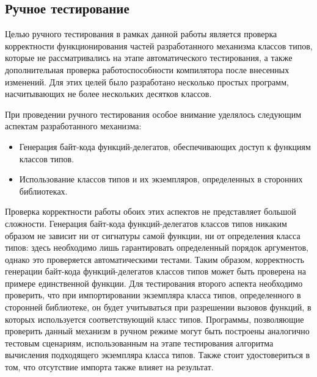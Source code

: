 \subsection{Ручное тестирование}

Целью ручного тестирования в рамках данной работы является проверка корректности функционирования частей разработанного механизма классов типов, которые не рассматривались на этапе автоматического тестирования, а также дополнительная проверка работоспособности компилятора после внесенных изменений. Для этих целей было разработано несколько простых программ, насчитывающих не более нескольких десятков классов. 

При проведении ручного тестирования особое внимание уделялось следующим аспектам разработанного механизма:
\begin{itemize}
    \item Генерация байт-кода функций-делегатов, обеспечивающих доступ к функциям классов типов.
    \item Использование классов типов и их экземпляров, определенных в сторонних библиотеках.
\end{itemize}
Проверка корректности работы обоих этих аспектов не представляет большой сложности. Генерация байт-кода функций-делегатов классов типов никаким образом не зависит ни от сигнатуры самой функции, ни от определения класса типов: здесь необходимо лишь гарантировать определенный порядок аргументов, однако это проверяется автоматическими тестами. Таким образом, корректность генерации байт-кода функций-делегатов классов типов может быть проверена на примере единственной функции. Для тестирования второго аспекта необходимо проверить, что при импортировании экземпляра класса типов, определенного в сторонней библиотеке, он будет учитываться при разрешении вызовов функций, в которых используется соответствующий класс типов. Программы, позволяющие проверить данный механизм в ручном режиме могут быть построены аналогично тестовым сценариям, использованным на этапе тестирования алгоритма вычисления подходящего экземпляра класса типов. Также стоит удостовериться в том, что отсутствие импорта также влияет на результат.